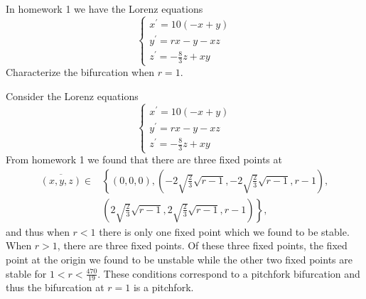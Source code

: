 \documentclass[12pt]{report}
\begin{document}
\newpage



\begin{problem}
    In homework 1 we have the Lorenz equations
    \begin{equation}
        \left\{\begin{array}{l}
        x^{\prime}=10(-x+y) \\
        y^{\prime}=r x-y-x z \\
        z^{\prime}=-\frac{8}{3} z+x y
        \end{array}\right.
    \end{equation}
    Characterize the bifurcation when $r=1$.
\end{problem}

\begin{solution}

    \noindent
    Consider the Lorenz equations
    \begin{equation}
        \left\{\begin{array}{l}
        x^{\prime}=10(-x+y) \\
        y^{\prime}=r x-y-x z \\
        z^{\prime}=-\frac{8}{3} z+x y
        \end{array}\right.
    \end{equation}
    From homework 1 we found that there are three fixed points at
    \begin{align*}
        \overline{(x,y,z)} \in & \left\{ (0,0,0), \left(-2 \sqrt{\frac{2}{3}} \sqrt{r-1},-2 \sqrt{\frac{2}{3}} \sqrt{r-1},r-1\right), \right. \\ & \left. \left(2 \sqrt{\frac{2}{3}} \sqrt{r-1}, 2 \sqrt{\frac{2}{3}} \sqrt{r-1}, r-1\right) \right\},
    \end{align*}
    and thus when $r < 1$ there is only one fixed point which we found to be stable. When $r>1$, there are three fixed points. Of these three fixed points, the fixed point at the origin we found to be unstable while the other two fixed points are stable for $1<r<\frac{470}{19}$. These conditions correspond to a pitchfork bifurcation and thus the bifurcation at $r=1$ is a pitchfork. 

\end{solution}

\newpage
\end{document}
